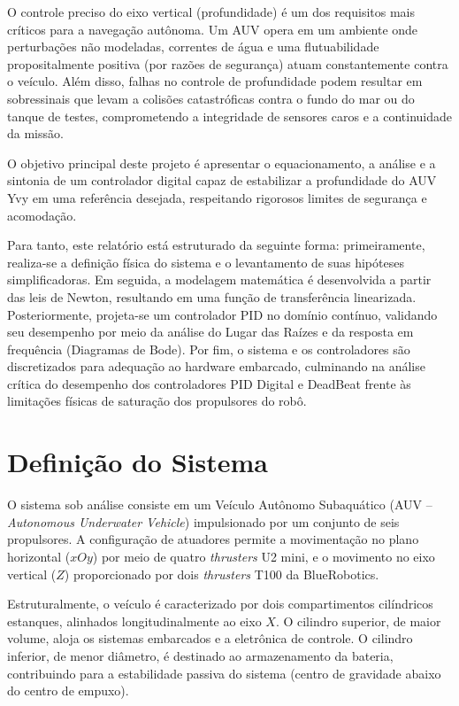 \documentclass[12pt, a4paper]{article}
\begin{document}
		O controle preciso do eixo vertical (profundidade) é um dos requisitos mais críticos para a navegação autônoma. Um AUV opera em um ambiente onde perturbações não modeladas, correntes de água e uma flutuabilidade propositalmente positiva (por razões de segurança) atuam constantemente contra o veículo. Além disso, falhas no controle de profundidade podem resultar em sobressinais que levam a colisões catastróficas contra o fundo do mar ou do tanque de testes, comprometendo a integridade de sensores caros e a continuidade da missão.

		O objetivo principal deste projeto é apresentar o equacionamento, a análise e a sintonia de um controlador digital capaz de estabilizar a profundidade do AUV Yvy em uma referência desejada, respeitando rigorosos limites de segurança e acomodação. 

		Para tanto, este relatório está estruturado da seguinte forma: primeiramente, realiza-se a definição física do sistema e o levantamento de suas hipóteses simplificadoras. Em seguida, a modelagem matemática é desenvolvida a partir das leis de Newton, resultando em uma função de transferência linearizada. Posteriormente, projeta-se um controlador PID no domínio contínuo, validando seu desempenho por meio da análise do Lugar das Raízes e da resposta em frequência (Diagramas de Bode). Por fim, o sistema e os controladores são discretizados para adequação ao hardware embarcado, culminando na análise crítica do desempenho dos controladores PID Digital e DeadBeat frente às limitações físicas de saturação dos propulsores do robô.

	\section{Definição do Sistema}

		O sistema sob análise consiste em um Veículo Autônomo Subaquático (AUV -- \textit{Autonomous Underwater Vehicle}) impulsionado por um conjunto de seis propulsores. A configuração de atuadores permite a movimentação no plano horizontal ($xOy$) por meio de quatro \textit{thrusters} U2 mini, e o movimento no eixo vertical ($Z$) proporcionado por dois \textit{thrusters} T100 da BlueRobotics.

		Estruturalmente, o veículo é caracterizado por dois compartimentos cilíndricos estanques, alinhados longitudinalmente ao eixo $X$. O cilindro superior, de maior volume, aloja os sistemas embarcados e a eletrônica de controle. O cilindro inferior, de menor diâmetro, é destinado ao armazenamento da bateria, contribuindo para a estabilidade passiva do sistema (centro de gravidade abaixo do centro de empuxo).
\end{document}
